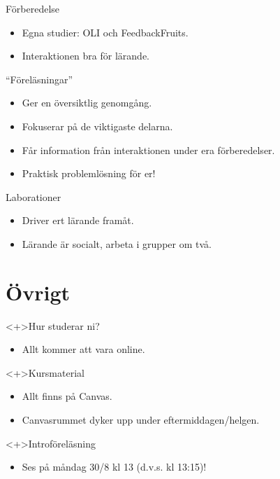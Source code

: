 \begin{frame}
  \begin{block}{Förberedelse}
    \begin{itemize}
      \item Egna studier: OLI och FeedbackFruits.
      \item Interaktionen bra för lärande.
    \end{itemize}
  \end{block}

  \pause
  
  \begin{block}{\enquote{Föreläsningar}}
    \begin{itemize}
      \item Ger en översiktlig genomgång.
      \item Fokuserar på de viktigaste delarna.
      \item Får information från interaktionen under era förberedelser.
      \item Praktisk problemlösning för er!
    \end{itemize}
  \end{block}
\end{frame}

\begin{frame}
  \begin{block}{Laborationer}
    \begin{itemize}
      \item Driver ert lärande framåt.
      \item Lärande är socialt, arbeta i grupper om två.
    \end{itemize}
  \end{block}
\end{frame}

\section{Övrigt}

\begin{frame}
  \begin{block}<+>{Hur studerar ni?}
    \begin{itemize}
      \item Allt kommer att vara online.
    \end{itemize}
  \end{block}

  \begin{block}<+>{Kursmaterial}
    \begin{itemize}
      \item Allt finns på Canvas.
      \item Canvasrummet dyker upp under eftermiddagen/helgen.
    \end{itemize}
  \end{block}

  \begin{block}<+>{Introföreläsning}
    \begin{itemize}
      \item Ses på måndag 30/8 kl 13 (d.v.s. kl 13:15)!
    \end{itemize}
  \end{block}
\end{frame}

